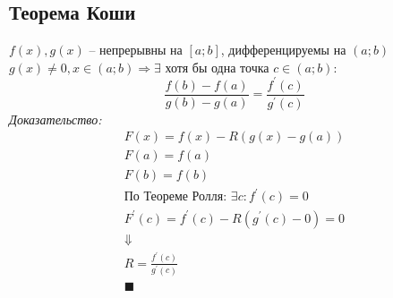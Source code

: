 \documentclass[12pt, fleqn]{article}
\begin{document}
\subsection{Теорема Коши}
$f(x), g(x)$ -- непрерывны на $\left[a;b\right]$, дифференцируемы на $\left(a;b\right)$\\
$g(x)\neq 0, x \in \left(a;b\right) \Rightarrow \exists$ хотя бы одна точка $c\in\left(a;b\right)$:\\
$$\frac{f(b)-f(a)}{g(b)-g(a)}=\frac{f^\prime(c)}{g^\prime(c)}$$
\textit{Доказательство:}
\begin{multline*}
	F(x)=f(x) - R\left(g(x)-g(a)\right)\\
	F(a)=f(a)\\
	F(b)= f(b)\\
	\text{По Теореме Ролля: } \exists c \colon f^\prime(c)=0\\
	F^\prime(c)=f^\prime(c)-R\left(g^\prime(c)-0\right)=0\\
	\Downarrow\\
	R=\frac{f^\prime(c)}{g^\prime(c)}\\
	\blacksquare\\
\end{multline*}
\end{document}
